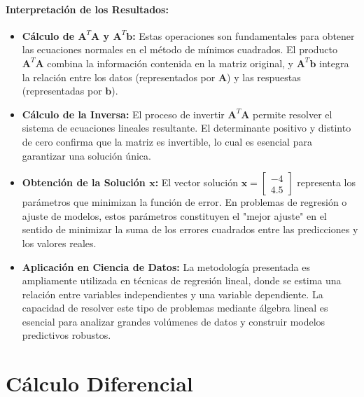 \documentclass[12pt,a4,oneside]{book}
\begin{document}
	\paragraph{Interpretación de los Resultados:}
	
	\begin{itemize}
		\item \textbf{Cálculo de \(\mathbf{A}^T \mathbf{A}\) y \(\mathbf{A}^T \mathbf{b}\):}  
		Estas operaciones son fundamentales para obtener las ecuaciones normales en el método de mínimos cuadrados. El producto \(\mathbf{A}^T \mathbf{A}\) combina la información contenida en la matriz original, y \(\mathbf{A}^T \mathbf{b}\) integra la relación entre los datos (representados por \(\mathbf{A}\)) y las respuestas (representadas por \(\mathbf{b}\)).
		
		\item \textbf{Cálculo de la Inversa:}  
		El proceso de invertir \(\mathbf{A}^T \mathbf{A}\) permite resolver el sistema de ecuaciones lineales resultante. El determinante positivo y distinto de cero confirma que la matriz es invertible, lo cual es esencial para garantizar una solución única.
		
		\item \textbf{Obtención de la Solución \(\mathbf{x}\):}  
		El vector solución \(\mathbf{x} = \begin{bmatrix} -4 \\ 4.5 \end{bmatrix}\) representa los parámetros que minimizan la función de error. En problemas de regresión o ajuste de modelos, estos parámetros constituyen el "mejor ajuste" en el sentido de minimizar la suma de los errores cuadrados entre las predicciones y los valores reales.
		
		\item \textbf{Aplicación en Ciencia de Datos:}  
		La metodología presentada es ampliamente utilizada en técnicas de regresión lineal, donde se estima una relación entre variables independientes y una variable dependiente. La capacidad de resolver este tipo de problemas mediante álgebra lineal es esencial para analizar grandes volúmenes de datos y construir modelos predictivos robustos.
	\end{itemize}
	
	\section{Cálculo Diferencial}
	
\end{document}
